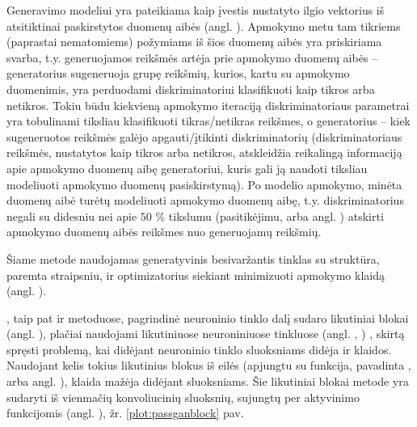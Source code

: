 \documentclass{VUMIFInfBakalaurinis}
\begin{document}
Generavimo modeliui yra pateikiama kaip įvestis nustatyto ilgio vektorius iš 
atsitiktinai paskirstytos duomenų aibės (angl. ). Apmokymo metu tam tikriems (paprastai nematomiems) požymiams iš 
šios duomenų aibės yra priskiriama svarba, t.y. generuojamos reikšmės artėja 
prie apmokymo duomenų aibės -- generatorius sugeneruoja grupę reikšmių, kurios, 
kartu su apmokymo duomenimis, yra perduodami diskriminatoriui klasifikuoti kaip 
tikros arba netikros. Tokiu būdu kiekvieną apmokymo iteraciją diskriminatoriaus 
parametrai yra tobulinami tiksliau klasifikuoti tikras/netikras reikšmes, o 
generatorius -- kiek sugeneruotos reikšmės galėjo apgauti/įtikinti 
diskriminatorių (diskriminatoriaus reikšmės, nustatytos kaip tikros arba 
netikros, atskleidžia reikalingą informaciją apie apmokymo duomenų aibę 
generatoriui, kuris gali ją naudoti tiksliau modeliuoti apmokymo duomenų 
pasiskirstymą). Po modelio apmokymo, minėta duomenų aibė turėtų modeliuoti 
apmokymo duomenų aibę, t.y. diskriminatorius negali su didesniu nei apie $50$ \% 
tikslumu (pasitikėjimu, arba angl. ) atskirti apmokymo 
duomenų aibės reikšmes nuo generuojamų reikšmių.

Šiame metode naudojamas generatyvinis besivaržantis tinklas su struktūra, 
paremta  \cite{GAN} straipsniu, ir  
optimizatorius \cite{ADAM} siekiant minimizuoti apmokymo klaidą (angl. 
).

, taip pat ir  metoduose, pagrindinė 
neuroninio tinklo dalį sudaro likutiniai blokai (angl. ), plačiai naudojami likutiniuose neuroniniuose tinkluose (angl. 
, ) \cite{ResNet}, skirtą 
spręsti problemą, kai didėjant neuroninio tinklo sluoksniams didėja ir klaidos. 
Naudojant kelis tokius likutinius blokus iš eilės (apjungtu su funkcija, 
pavadinta , arba angl. ), klaida mažėja didėjant sluoksniams. Šie likutiniai blokai 
 metode yra sudaryti iš vienmačių konvoliucinių sluoksnių, 
sujungtų per  aktyvinimo funkcijomis (angl. 
), žr. \ref{plot:passganblock} pav.
\end{document}

